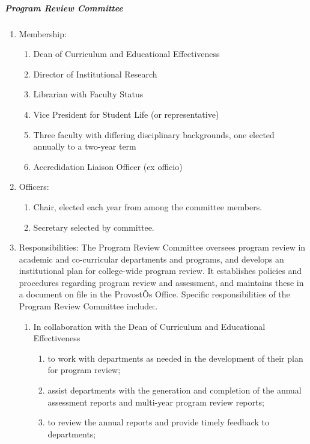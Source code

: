 \documentclass[letterpaper, 11pt]{article}
\begin{document}
				\subparagraph{Program Review Committee}
					\begin{enumerate}[label=\alph*)]
						\item{Membership:
							\begin{enumerate}[label=\arabic*)]
								\item{Dean of Curriculum and Educational Effectiveness}
								\item{Director of Institutional Research}
								\item{Librarian with Faculty Status}
								\item{Vice President for Student Life (or representative)}
								\item{Three faculty with differing disciplinary backgrounds, one elected annually to a two-year term}
								\item{Accredidation Liaison Officer (ex officio)}
							\end{enumerate}
						}
						\item{Officers:
							\begin{enumerate}[label=\arabic*)]
								\item{Chair, elected each year from among the committee members.}
								\item{Secretary selected by committee.}
							\end{enumerate}
						}
						\item{Responsibilities:
							The Program Review Committee oversees program review in academic and co-curricular departments and programs, and develops an institutional plan for college-wide program review.  It establishes policies and procedures regarding program review and assessment, and maintains these in a document on file in the ProvostÕs Office.  Specific responsibilities of the Program Review Committee include:.
							\begin{enumerate}[label=\arabic*)]
								\item{In collaboration with the Dean of Curriculum and Educational Effectiveness
									\begin{enumerate}[label=(\alph*)]
										\item{to work with departments as needed in the development of their plan for program review;}
										\item{assist departments with the generation and completion of the annual assessment reports and multi-year program review reports;}
										\item{to review the annual reports and provide timely feedback to departments;}

\end{enumerate}}
\end{enumerate}}
\end{enumerate}
\end{document}
